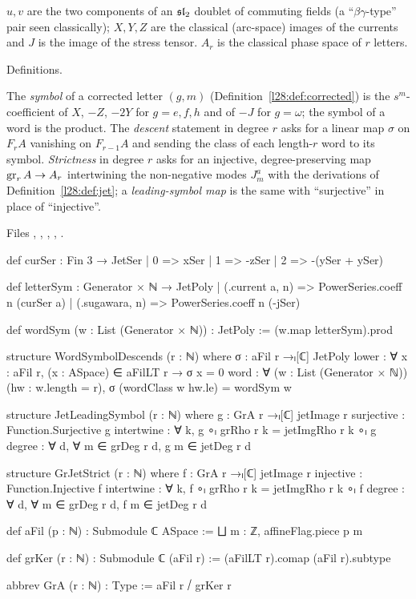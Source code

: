 \begin{physics}
$u,v$ are the two components of an $\mathfrak{sl}_2$ doublet of commuting fields (a ``$\beta\gamma$-type'' pair seen classically); $X,Y,Z$ are the
classical (arc-space) images of the currents and $J$ is the image of the stress tensor. $A_r$ is the classical phase space of $r$ letters.
\end{physics}

\begin{status}
Definitions.
\end{status}

\begin{definition}\label{l28:def:symbols}
The \emph{symbol} of a corrected letter $(g,m)$ (Definition~\ref{l28:def:corrected}) is the $s^m$-coefficient of $X$, $-Z$, $-2Y$ for $g=e,f,h$ and of
$-J$ for $g=\omega$; the symbol of a word is the product. The \emph{descent} statement in degree $r$ asks for a linear map $\sigma$ on $F_rA$ vanishing
on $F_{r-1}A$ and sending the class of each length-$r$ word to its symbol. \emph{Strictness} in degree $r$ asks for an injective, degree-preserving map
$\operatorname{gr}_rA\to A_r$ intertwining the non-negative modes $J^a_m$ with the derivations of Definition~\ref{l28:def:jet}; a \emph{leading-symbol
map} is the same with ``surjective'' in place of ``injective''.
\end{definition}

\noindent Files , ,
, , .
\begin{leancode}
def curSer : Fin 3 → JetSer
  | 0 => xSer
  | 1 => -zSer
  | 2 => -(ySer + ySer)

def letterSym : Generator × ℕ → JetPoly
  | (.current a, n) => PowerSeries.coeff n (curSer a)
  | (.sugawara, n) => PowerSeries.coeff n (-jSer)

def wordSym (w : List (Generator × ℕ)) : JetPoly := (w.map letterSym).prod

structure WordSymbolDescends (r : ℕ) where
  σ : aFil r →ₗ[ℂ] JetPoly
  lower : ∀ x : aFil r, (x : ASpace) ∈ aFilLT r → σ x = 0
  word : ∀ (w : List (Generator × ℕ)) (hw : w.length = r), σ (wordClass w hw.le) = wordSym w

structure JetLeadingSymbol (r : ℕ) where
  g : GrA r →ₗ[ℂ] jetImage r
  surjective : Function.Surjective g
  intertwine : ∀ k, g ∘ₗ grRho r k = jetImgRho r k ∘ₗ g
  degree : ∀ d, ∀ m ∈ grDeg r d, g m ∈ jetDeg r d

structure GrJetStrict (r : ℕ) where
  f : GrA r →ₗ[ℂ] jetImage r
  injective : Function.Injective f
  intertwine : ∀ k, f ∘ₗ grRho r k = jetImgRho r k ∘ₗ f
  degree : ∀ d, ∀ m ∈ grDeg r d, f m ∈ jetDeg r d

def aFil (p : ℕ) : Submodule ℂ ASpace := ⨆ m : ℤ, affineFlag.piece p m

def grKer (r : ℕ) : Submodule ℂ (aFil r) := (aFilLT r).comap (aFil r).subtype

abbrev GrA (r : ℕ) : Type := aFil r ⧸ grKer r
\end{leancode}

